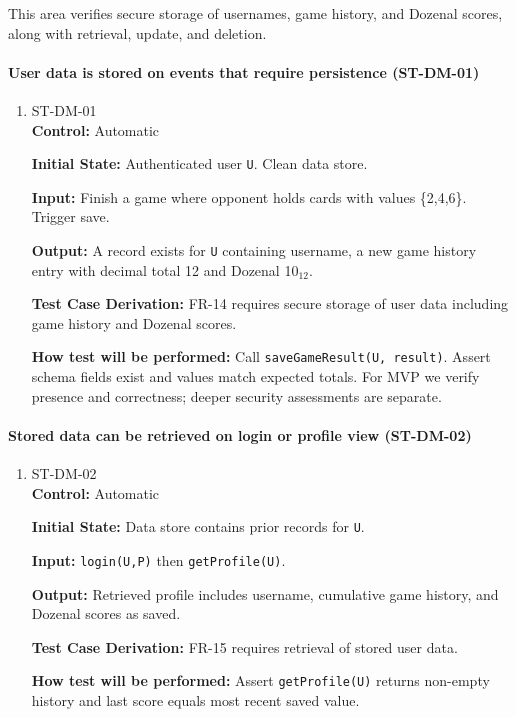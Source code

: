 \documentclass[12pt, titlepage]{article}
\begin{document}
This area verifies secure storage of usernames, game history, and Dozenal scores, along with retrieval, update, and deletion.

\paragraph{User data is stored on events that require persistence (ST-DM-01)}
\begin{enumerate}
\item{ST-DM-01\\}
\textbf{Control:} Automatic

\textbf{Initial State:} Authenticated user \texttt{U}. Clean data store.

\textbf{Input:} Finish a game where opponent holds cards with values \{2,4,6\}. Trigger save.

\textbf{Output:} A record exists for \texttt{U} containing username, a new game history entry with decimal total 12 and Dozenal 10$_{12}$.

\textbf{Test Case Derivation:} FR-14 requires secure storage of user data including game history and Dozenal scores.

\textbf{How test will be performed:} Call \texttt{saveGameResult(U, result)}. Assert schema fields exist and values match expected totals. For MVP we verify presence and correctness; deeper security assessments are separate.
\end{enumerate}

\paragraph{Stored data can be retrieved on login or profile view (ST-DM-02)}
\begin{enumerate}
\item{ST-DM-02\\}
\textbf{Control:} Automatic

\textbf{Initial State:} Data store contains prior records for \texttt{U}.

\textbf{Input:} \texttt{login(U,P)} then \texttt{getProfile(U)}.

\textbf{Output:} Retrieved profile includes username, cumulative game history, and Dozenal scores as saved.

\textbf{Test Case Derivation:} FR-15 requires retrieval of stored user data.

\textbf{How test will be performed:} Assert \texttt{getProfile(U)} returns non-empty history and last score equals most recent saved value.
\end{enumerate}
\end{document}
